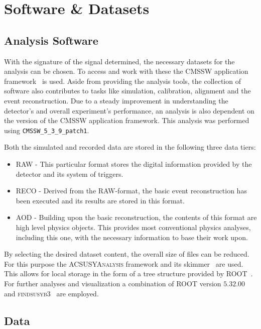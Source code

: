 \chapter{Software \& Datasets}
\label{cha:datasets}

\section{Analysis Software}

With the signature of the signal determined, the necessary datasets for the analysis can be chosen. To access and work with these the \textsc{CMSSW} application framework~\cite{cmssw} is used. Aside from providing the analysis tools, the collection of software also contributes to tasks like simulation, calibration, alignment and the event reconstruction. Due to a steady improvement in understanding the detector's and overall experiment's performance, an analysis is also dependent on the version of the \textsc{CMSSW} application framework. This analysis was performed using \verb+CMSSW_5_3_9_patch1+.

Both the simulated and recorded data are stored in the following three data tiers:

\begin{itemize}
\item \textsc{RAW} - This particular format stores the digital information provided by the detector and its system of triggers.
\item \textsc{RECO} - Derived from the \textsc{RAW}-format, the basic event reconstruction has been executed and its results are stored in this format.
\item \textsc{AOD} - Building upon the basic reconstruction, the contents of this format are high level physics objects. This provides most conventional physics analyses, including this one, with the necessary information to base their work upon.
\end{itemize}

By selecting the desired dataset content, the overall size of files can be reduced. For this purpose the \textsc{ACSUSYAnalysis} framework and its skimmer~\cite{acsusyana} are used. This allows for local storage in the form of a tree structure provided by \textsc{ROOT}~\cite{root}. For further analyses and visualization a combination of \textsc{ROOT} version $5.32.00$ and \textsc{findsusyb3}~\cite{findsusyb3} are employed. 


\section{Data}

